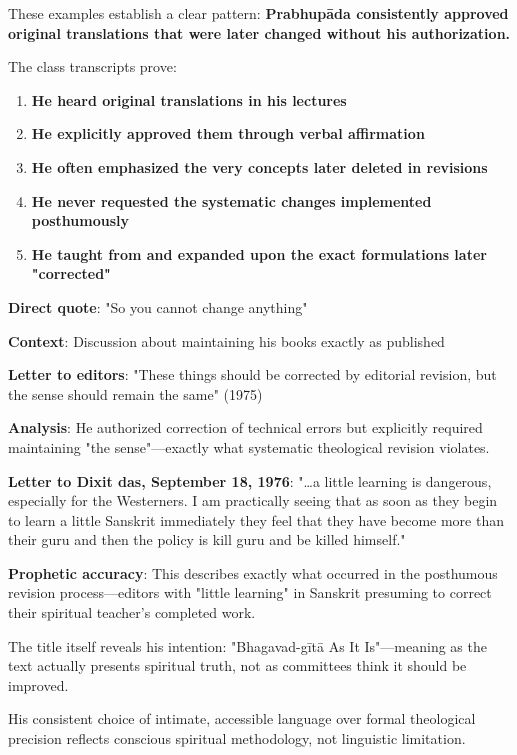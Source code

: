 \documentclass[12pt,twoside]{book}
\begin{document}
These examples establish a clear pattern: \textbf{\textbf{Prabhupāda consistently approved original translations that were later changed without his authorization.}}

The class transcripts prove:
\begin{enumerate}
\item \textbf{\textbf{He heard original translations in his lectures}}
\item \textbf{\textbf{He explicitly approved them through verbal affirmation}}
\item \textbf{\textbf{He often emphasized the very concepts later deleted in revisions}}
\item \textbf{\textbf{He never requested the systematic changes implemented posthumously}}
\item \textbf{\textbf{He taught from and expanded upon the exact formulations later "corrected"}}
\end{enumerate}


\textbf{\textbf{Direct quote}}: "So you cannot change anything"

\textbf{\textbf{Context}}: Discussion about maintaining his books exactly as published

\textbf{\textbf{Letter to editors}}: "These things should be corrected by editorial revision, but the sense should remain the same" (1975)

\textbf{\textbf{Analysis}}: He authorized correction of technical errors but explicitly required maintaining "the sense"—exactly what systematic theological revision violates.

\textbf{\textbf{Letter to Dixit das, September 18, 1976}}: "\ldots{}a little learning is dangerous, especially for the Westerners. I am practically seeing that as soon as they begin to learn a little Sanskrit immediately they feel that they have become more than their guru and then the policy is kill guru and be killed himself."

\textbf{\textbf{Prophetic accuracy}}: This describes exactly what occurred in the posthumous revision process—editors with "little learning" in Sanskrit presuming to correct their spiritual teacher's completed work.


The title itself reveals his intention: "Bhagavad-gītā As It Is"—meaning as the text actually presents spiritual truth, not as committees think it should be improved.

His consistent choice of intimate, accessible language over formal theological precision reflects conscious spiritual methodology, not linguistic limitation.
\end{document}
